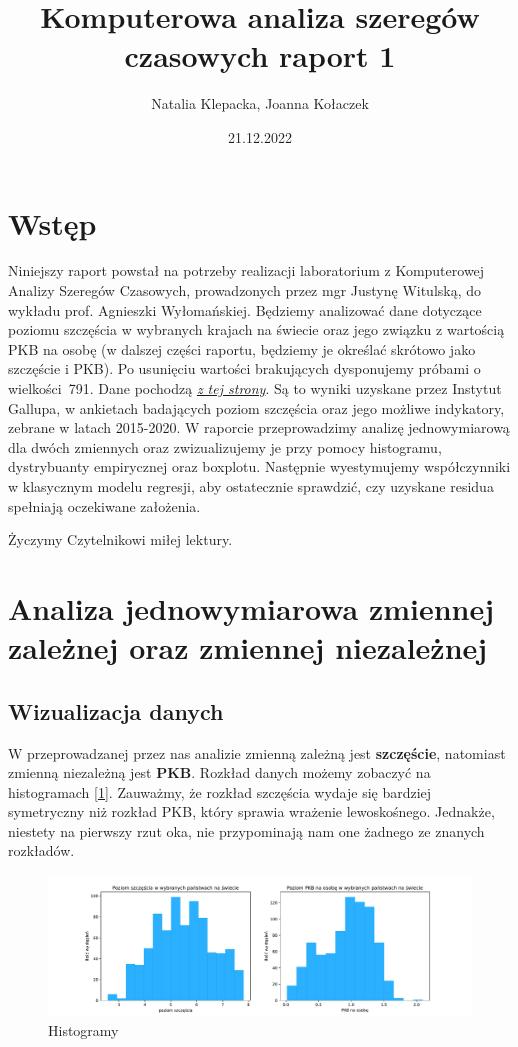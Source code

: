 \documentclass{article}
\title{Komputerowa analiza szeregów czasowych raport 1}
\author{Natalia Klepacka, Joanna Kołaczek}
\date{21.12.2022}
\theoremstyle{break}
\begin{document}
	\maketitle
	\tableofcontents
	\clearpage
\section{Wstęp}
	Niniejszy raport powstał na potrzeby realizacji laboratorium z Komputerowej Analizy Szeregów Czasowych, prowadzonych przez mgr Justynę Witulską, do wykładu prof. Agnieszki Wyłomańskiej.
	Będziemy analizować dane dotyczące poziomu szczęścia w wybranych krajach na świecie oraz jego związku z wartością PKB na osobę (w dalszej części raportu, będziemy je określać skrótowo jako szczęście i PKB). Po usunięciu wartości brakujących dysponujemy próbami o wielkości~791. Dane pochodzą \href{https://www.kaggle.com/datasets/eliasturk/world-happiness-based-on-cpi-20152020}{\textit{z tej strony}}. Są to wyniki uzyskane przez Instytut Gallupa, w ankietach badających poziom szczęścia oraz jego możliwe indykatory, zebrane  w latach 2015-2020. W raporcie przeprowadzimy analizę jednowymiarową dla dwóch zmiennych oraz zwizualizujemy je przy pomocy histogramu, dystrybuanty empirycznej oraz boxplotu. Następnie wyestymujemy współczynniki w klasycznym modelu regresji, aby ostatecznie sprawdzić, czy uzyskane residua spełniają oczekiwane założenia.
	
	Życzymy Czytelnikowi miłej lektury.
	
\section{Analiza jednowymiarowa zmiennej zależnej oraz zmiennej niezależnej}

\subsection{Wizualizacja danych}

W przeprowadzanej przez nas analizie zmienną zależną jest \textbf{szczęście}, natomiast zmienną niezależną jest \textbf{PKB}. Rozkład danych możemy zobaczyć na histogramach [\ref{fig:hist}]. Zauważmy, że rozkład szczęścia wydaje się bardziej symetryczny niż rozkład PKB, który sprawia wrażenie lewoskośnego. Jednakże, niestety na pierwszy rzut oka, nie przypominają nam one żadnego ze znanych rozkładów.

\begin{figure}[H]
	\begin{center}
		\includegraphics[scale=0.43]{hist.pdf}
		\caption{Histogramy}
		\label{fig:hist}
	\end{center}
\end{figure}
\end{document}
